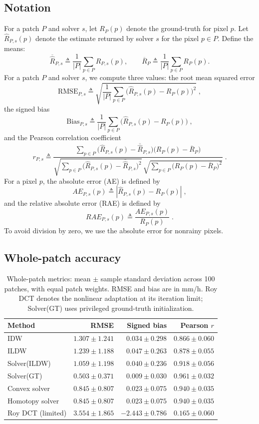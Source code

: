 \documentclass[a4paper,fleqn]{cas-sc}
\begin{document}
\subsection{Notation}
For a patch $P$ and solver $s$, let
$R_P(p)$ denote the ground-truth for pixel $p$.
Let $\widehat{R}_{P,s}(p)$ denote the estimate returned by solver $s$ for the pixel $p\in P$.
Define the means:
\[
  \overline{\widehat{R}}_{P,s}\triangleq \frac{1}{|P|}\sum_{p\in P}\widehat{R}_{P,s}(p),
  \qquad
  \overline{R}_P\triangleq \frac{1}{|P|}\sum_{p\in P}R_P(p).
\]
For a patch $P$ and solver $s$, we  compute three values: the root mean squared error
\[
  \mathrm{RMSE}_{P,s}\triangleq
  \sqrt{\frac{1}{|P|}\sum_{p\in P}\bigl(\widehat{R}_{P,s}(p)-R_P(p)\bigr)^2}\;,
\]
the signed bias
\[
  \mathrm{Bias}_{P,s}\triangleq
  \frac{1}{|P|}\sum_{p\in P}\bigl(\widehat{R}_{P,s}(p)-R_P(p)\bigr)\;,
\]
and the Pearson correlation coefficient
\[
  r_{P,s}\triangleq
  \frac{\sum_{p\in P}\bigl(\widehat{R}_{P,s}(p)-\overline{\widehat{R}}_{P,s}\bigr)\bigl(R_P(p)-\overline{R}_P\bigr)}
  {\sqrt{\sum_{p\in P}\bigl(\widehat{R}_{P,s}(p)-\overline{\widehat{R}}_{P,s}\bigr)^2}\,
    \sqrt{\sum_{p\in P}\bigl(R_P(p)-\overline{R}_P\bigr)^2}}\;.
\]
For a pixel $p$, the absolute error (AE) is defined by
\[
  AE_{P,s}(p) \triangleq |\widehat{R}_{P,s}(p)-R_P(p)|\;,
\]
and the relative absolute error (RAE) is defined by
\[
  RAE_{P,s}(p) \triangleq \frac{AE_{P,s}(p)}{R_P(p)}\;.
\]
To avoid division by zero, we use the absolute error for nonrainy pixels.

\subsection{Whole-patch accuracy}
\begin{table}[!htbp]
\centering\small
\begin{tabular}{lrrr}
\toprule
Method & RMSE & Signed bias & Pearson $r$ \\
\midrule
IDW & $1.307\pm 1.241$ & $0.034\pm 0.298$ & $0.866\pm 0.060$ \\
ILDW & $1.239\pm 1.188$ & $0.047\pm 0.263$ & $0.878\pm 0.055$ \\
Solver(ILDW) & $1.059\pm 1.198$ & $0.040\pm 0.236$ & $0.918\pm 0.056$ \\
Solver(GT) & $0.503\pm 0.371$ & $0.009\pm 0.030$ & $0.961\pm 0.032$ \\
Convex solver & $0.845\pm 0.807$ & $0.023\pm 0.075$ & $0.940\pm 0.035$ \\
Homotopy solver & $0.845\pm 0.807$ & $0.023\pm 0.075$ & $0.940\pm 0.035$ \\
Roy DCT (limited) & $3.554\pm 1.865$ & $-2.443\pm 0.786$ & $0.165\pm 0.060$ \\
\bottomrule
\end{tabular}
\caption{Whole-patch metrics: mean $\pm$ sample standard deviation across 100 patches, with equal patch weights. RMSE and bias are in mm/h. Roy DCT denotes the nonlinear adaptation at its iteration limit; Solver(GT) uses privileged ground-truth initialization.}
\label{tab:patch_map_metrics}
\end{table}
\end{document}
